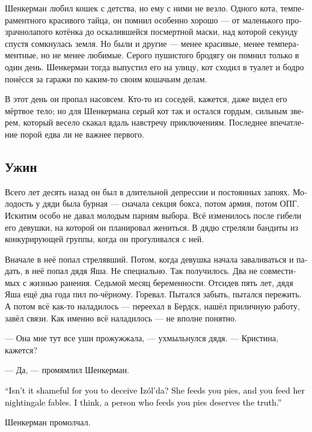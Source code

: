 \documentclass[a5paper,12pt,fleqn]{extbook}\usepackage{cooltooltips}\usepackage{polyglossia}\setdefaultlanguage[babelshorthands=true]{russian}\setotherlanguage{english}\defaultfontfeatures{Ligatures=TeX,Mapping=tex-text} \usepackage{xcolor}\definecolor{lightgray}{HTML}{bbbbbb}\color{lightgray}\newcommand{\ml}[3]{\textenglish{\textcolor{black}{#3}}}
\newcommand{\asterism}{\vspace{1em}{\centering\Large\bfseries$\ast~\ast~\ast$\par}\vspace{1em}}
\newcommand{\Izolda}{Iz\'ol'da}
\begin{document}
Шенкерман любил кошек с детства, но ему с ними не везло.
Одного кота, темпераментного красивого тайца, он помнил особенно хорошо --- от маленького прозрачнолапого котёнка до оскалившейся посмертной маски, над которой секунду спустя сомкнулась земля.
Но были и другие --- менее красивые, менее темпераментные, но не менее любимые.
Серого пушистого бродягу он помнил только в один день.
Шенкерман тогда выпустил его на улицу, кот сходил в туалет и бодро понёсся за гаражи по каким-то своим кошачьим делам.

В этот день он пропал насовсем.
Кто-то из соседей, кажется, даже видел его мёртвое тело;
но для Шенкермана серый кот так и остался гордым, сильным зверем, который весело скакал вдаль навстречу приключениям.
Последнее впечатление порой едва ли не важнее первого.

\subsection{Ужин}

Всего лет десять назад он был в длительной депрессии и постоянных запоях.
Молодость у дяди была бурная --- сначала секция бокса, потом армия, потом ОПГ.
Искитим особо не давал молодым парням выбора.
Всё изменилось после гибели его девушки, на которой он планировал жениться.
В дядю стреляли бандиты из конкурирующей группы, когда он прогуливался с ней.

Вначале в неё попал стрелявший.
Потом, когда девушка начала заваливаться и падать, в неё попал дядя Яша.
Не специально.
Так получилось.
Два не совместимых с жизнью ранения.
Седьмой месяц беременности.
Отсидев пять лет, дядя Яша ещё два года пил по-чёрному.
Горевал.
Пытался забыть, пытался пережить.
А потом всё как-то наладилось --- переехал в Бердск, нашёл приличную работу, завёл связи.
Как именно всё наладилось --- не вполне понятно.

\asterism

--- Она мне тут все уши прожужжала, --- ухмыльнулся дядя.
--- Кристина, кажется?

--- Да, --- промямлил Шенкерман.

\ml{$0$}
{--- И не стыдно тебе Изольду обманывать?}
{``Isn't it shameful for you to deceive \Izolda?}
\ml{$0$}
{Она тебя пирогами кормит, а ты её баснями соловьиными.}
{She feeds you pies, and you feed her nightingale fables.}
\ml{$0$}
{Как по мне, человек, который кормит тебя пирогами, заслуживает правды.}
{I think, a person who feeds you pies deserves the truth.''}

Шенкерман промолчал.
\end{document}
